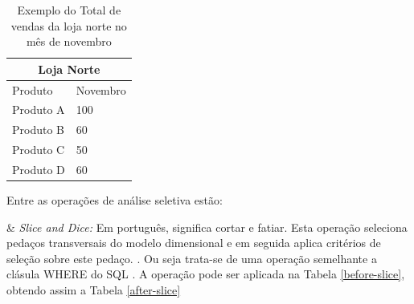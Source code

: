 \begin{table}[!ht]
\centering
\begin{tabular}{|l|l|}
\hline
\multicolumn{2}{|c|}{Loja Norte} \\ \hline
\cline{1-2}
Produto         & Novembro       \\ \hline
Produto A & 100 \\ \hline
Produto B & 60  \\ \hline
Produto C & 50  \\ \hline
Produto D & 60  \\ \hline

\end{tabular}
\caption{Exemplo do Total de vendas da loja norte no mês de novembro}
\label{after-across}
\end{table}

Entre as operações de análise seletiva estão:

\begin{easylist}[itemize]

& \textit{Slice and Dice:} Em português, significa cortar e fatiar. Esta operação seleciona pedaços transversais do modelo dimensional e em seguida aplica critérios de seleção sobre este pedaço. \cite{andre2000}. Ou seja trata-se de uma operação semelhante a clásula WHERE do SQL \cite{valeria2012}. A operação pode ser aplicada na Tabela \ref{before-slice}, obtendo assim a Tabela \ref{after-slice}


\end{easylist}

